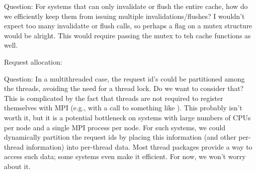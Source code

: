 Question: For systems that can only invalidate or flush the entire cache, how
do we efficiently keep them from issuing multiple invalidations/flushes?
I wouldn't expect too many invalidatte or flush calls, so perhaps a flag
on a mutex structure would be alright.  This would require passing the
mutex to teh cache functions as well.

Request allocation:

Question: In a multithreaded case, the request id's could be partitioned
among the threads, avoiding the need for a thread lock.  Do we want to
consider that?  This is complicated by the fact that threads are not
required to register themselves with MPI (e.g., with a call to something
like ).
This probably isn't worth it, but it is a potential bottleneck on systems with
large numbers of CPUs per node and a single MPI process per node.  For
such systems, we could dynamically partition the request ids by
placing this information (and other per-thread information) into
per-thread data.  Most thread packages provide a way to access such
data; some systems even make it efficient.  For now, we won't worry
about it.



\ifcodefirst
{}
\fi

